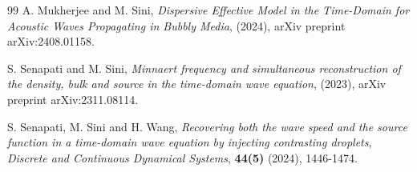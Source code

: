 \documentclass[11pt,reqno,twoside]{amsart}
\theoremstyle{definition}
\theoremstyle{remark}
\numberwithin{equation}{section}
\begin{document}
\begin{thebibliography}{99}
	A. Mukherjee and M. Sini, {\it Dispersive Effective Model in the Time-Domain for Acoustic Waves Propagating in Bubbly Media}, (2024), arXiv preprint arXiv:2408.01158.
	
	S. Senapati and M. Sini, {\it Minnaert frequency and simultaneous reconstruction of the density, bulk and source in the time-domain wave equation}, (2023), arXiv preprint arXiv:2311.08114.
	
	S. Senapati, M. Sini and H. Wang, {\it Recovering both the wave speed and the source function in a time-domain wave equation by injecting contrasting droplets}, {\em Discrete and Continuous Dynamical Systems}, {\bf 44(5)} (2024), 1446-1474. 
	
	
	
	
	
	
	
	
	
	
	
	
\end{thebibliography}
\end{document}
